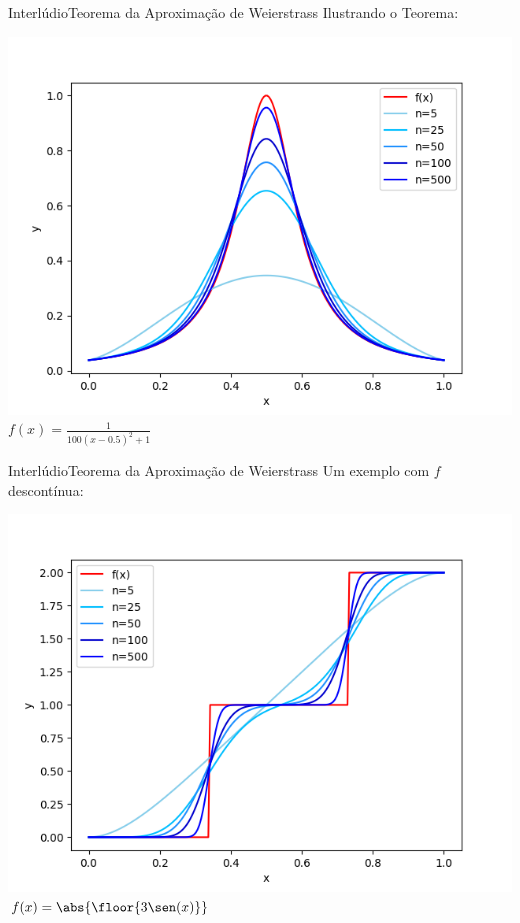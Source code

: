 \documentclass[13pt]{beamer}
\begin{document}
\begin{frame}{Interlúdio}{Teorema da Aproximação de Weierstrass}
    \vspace{3pt}
    Ilustrando o Teorema:
    \begin{center}
        \includegraphics[width=.75\textwidth]{../figuras/weierstrass_cauchy.png}
        \( f ( x ) = \frac{ 1 }{ 100 ( x - 0.5 )^2 + 1 } \)
    \end{center}
\end{frame}

\begin{frame}{Interlúdio}{Teorema da Aproximação de Weierstrass}
    \vspace{3pt}
    Um exemplo com \( f \) descontínua:
    \begin{center}
        \includegraphics[width=.75\textwidth]{../figuras/weierstrass_cobrinha.png}
        \( f ( x ) = \abs{ \floor{3\sen ( x )} } \)
    \end{center}
\end{frame}
\end{document}
